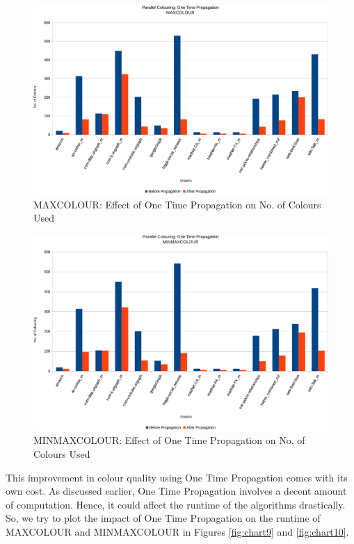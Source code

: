 \documentclass[MTech]{iitmdiss}
\begin{document}
\begin{figure}[h]
    \centering
    \includegraphics[width=\textwidth,keepaspectratio=true]{chartNewest7.pdf}
    \caption{
        MAXCOLOUR: Effect of One Time Propagation on No. of Colours Used
    }
    \label{fig:chart7}
\end{figure}

\begin{figure}[h]
    \centering
    \includegraphics[width=\textwidth,keepaspectratio=true]{chartNewest8.pdf}
    \caption{
        MINMAXCOLOUR: Effect of One Time Propagation on No. of Colours Used
    }
    \label{fig:chart8}
\end{figure}

This improvement in colour quality using One Time Propagation comes with its own cost. As discussed earlier, One Time Propagation involves a decent amount of computation. Hence, it could affect the runtime of the algorithms drastically. So, we try to plot the impact of One Time Propagation on the runtime of MAXCOLOUR and MINMAXCOLOUR in Figures \ref{fig:chart9} and \ref{fig:chart10}. 
\end{document}
